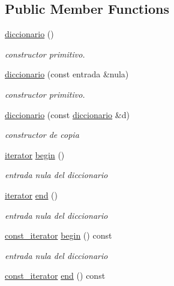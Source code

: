 \subsection*{Public Member Functions}
\begin{DoxyCompactItemize}
\item 
\hyperlink{classdiccionario_ad96220ec5717fc4459db4143f5574f58}{diccionario} ()
\begin{DoxyCompactList}\small\item\em constructor primitivo. \end{DoxyCompactList}\item 
\hyperlink{classdiccionario_a6fc7b9ee97be65525d40e1e406963508}{diccionario} (const entrada \&nula)
\begin{DoxyCompactList}\small\item\em constructor primitivo. \end{DoxyCompactList}\item 
\hyperlink{classdiccionario_adda370097759e831b5fae25be821dd10}{diccionario} (const \hyperlink{classdiccionario}{diccionario} \&d)
\begin{DoxyCompactList}\small\item\em constructor de copia \end{DoxyCompactList}\item 
\hyperlink{classdiccionario_1_1iterator}{iterator} \hyperlink{classdiccionario_aadcc6fd35bde4ca41a5b27854021ae3d}{begin} ()
\begin{DoxyCompactList}\small\item\em entrada nula del diccionario \end{DoxyCompactList}\item 
\hyperlink{classdiccionario_1_1iterator}{iterator} \hyperlink{classdiccionario_a9e47a236fec771b6037d9ebd864d13fb}{end} ()
\begin{DoxyCompactList}\small\item\em entrada nula del diccionario \end{DoxyCompactList}\item 
\hyperlink{classdiccionario_1_1const__iterator}{const\-\_\-iterator} \hyperlink{classdiccionario_a36cc7a6aa3100b901e09c37a0d6bfbc3}{begin} () const 
\begin{DoxyCompactList}\small\item\em entrada nula del diccionario \end{DoxyCompactList}\item 
\hyperlink{classdiccionario_1_1const__iterator}{const\-\_\-iterator} \hyperlink{classdiccionario_ac4c75009b8e345000379781ce965c9f8}{end} () const 

\end{DoxyCompactItemize}
